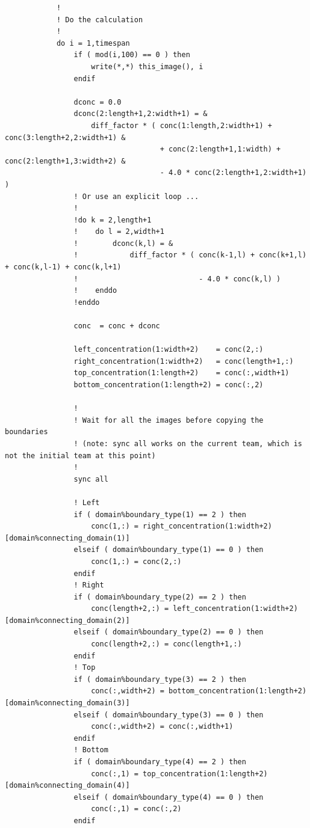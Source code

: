 \documentclass[onecolumn]{article}
\begin{document}
\begin{small}
\begin{verbatim}
            !
            ! Do the calculation
            !
            do i = 1,timespan
                if ( mod(i,100) == 0 ) then
                    write(*,*) this_image(), i
                endif

                dconc = 0.0
                dconc(2:length+1,2:width+1) = &
                    diff_factor * ( conc(1:length,2:width+1) + conc(3:length+2,2:width+1) &
                                    + conc(2:length+1,1:width) + conc(2:length+1,3:width+2) &
                                    - 4.0 * conc(2:length+1,2:width+1) )
                ! Or use an explicit loop ...
                !
                !do k = 2,length+1
                !    do l = 2,width+1
                !        dconc(k,l) = &
                !            diff_factor * ( conc(k-1,l) + conc(k+1,l) + conc(k,l-1) + conc(k,l+1)
                !                            - 4.0 * conc(k,l) )
                !    enddo
                !enddo

                conc  = conc + dconc

                left_concentration(1:width+2)    = conc(2,:)
                right_concentration(1:width+2)   = conc(length+1,:)
                top_concentration(1:length+2)    = conc(:,width+1)
                bottom_concentration(1:length+2) = conc(:,2)

                !
                ! Wait for all the images before copying the boundaries
                ! (note: sync all works on the current team, which is not the initial team at this point)
                !
                sync all

                ! Left
                if ( domain%boundary_type(1) == 2 ) then
                    conc(1,:) = right_concentration(1:width+2)[domain%connecting_domain(1)]
                elseif ( domain%boundary_type(1) == 0 ) then
                    conc(1,:) = conc(2,:)
                endif
                ! Right
                if ( domain%boundary_type(2) == 2 ) then
                    conc(length+2,:) = left_concentration(1:width+2)[domain%connecting_domain(2)]
                elseif ( domain%boundary_type(2) == 0 ) then
                    conc(length+2,:) = conc(length+1,:)
                endif
                ! Top
                if ( domain%boundary_type(3) == 2 ) then
                    conc(:,width+2) = bottom_concentration(1:length+2)[domain%connecting_domain(3)]
                elseif ( domain%boundary_type(3) == 0 ) then
                    conc(:,width+2) = conc(:,width+1)
                endif
                ! Bottom
                if ( domain%boundary_type(4) == 2 ) then
                    conc(:,1) = top_concentration(1:length+2)[domain%connecting_domain(4)]
                elseif ( domain%boundary_type(4) == 0 ) then
                    conc(:,1) = conc(:,2)
                endif


\end{verbatim}
\end{small}
\end{document}
